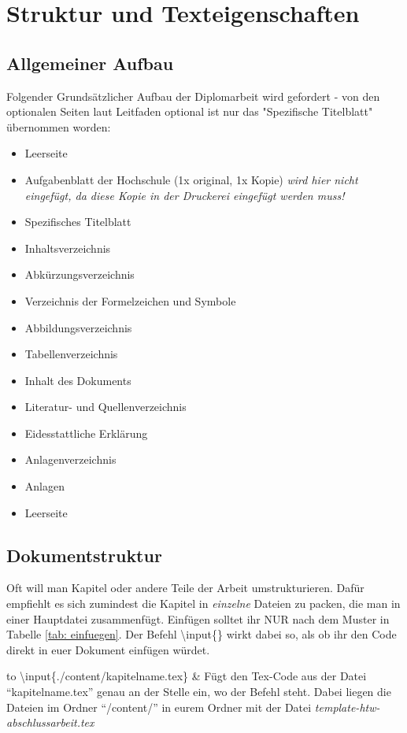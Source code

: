 \chapter{Struktur und Texteigenschaften}%
\section{Allgemeiner Aufbau}%
Folgender Grundsätzlicher Aufbau der Diplomarbeit wird gefordert - von den optionalen Seiten laut Leitfaden optional ist nur das "Spezifische Titelblatt" übernommen worden:%
\begin{itemize}%
 \item Leerseite%
 \item Aufgabenblatt der Hochschule (1x original, 1x Kopie) \emph{wird hier nicht eingefügt, da diese Kopie in der Druckerei eingefügt werden muss!}%
 \item Spezifisches Titelblatt%
 \item Inhaltsverzeichnis%
 \item Abkürzungsverzeichnis%
 \item Verzeichnis der Formelzeichen und Symbole%
 \item Abbildungsverzeichnis%
 \item Tabellenverzeichnis%
 \item Inhalt des Dokuments%
 \item Literatur- und Quellenverzeichnis%
 \item Eidesstattliche Erklärung%
 \item Anlagenverzeichnis%
 \item Anlagen%
 \item Leerseite%
\end{itemize}%
%
%
%
\section{Dokumentstruktur}%
Oft will man Kapitel oder andere Teile der Arbeit umstrukturieren. Dafür empfiehlt es sich zumindest die Kapitel in \emph{einzelne} Dateien zu packen, die man in einer Hauptdatei zusammenfügt. Einfügen solltet ihr \textsc{NUR} nach dem Muster in Tabelle \ref{tab: einfuegen}. Der Befehl \textbackslash input\{\} wirkt dabei so, als ob ihr den Code direkt in euer Dokument einfügen würdet.%
\begin{table}[h]%
\label{tab: einfuegen}%
\begin{tabu} to \textwidth {X[c]X[c]}%
\toprule%
\textbackslash input\{./content/kapitelname.tex\} & Fügt den Tex-Code aus der Datei "`kapitelname.tex"' genau an der Stelle ein, wo der Befehl steht. Dabei liegen die Dateien im Ordner "`/content/"' in eurem Ordner mit der Datei \emph{template-htw-abschlussarbeit.tex}\\%
\bottomrule%
\end{tabu}%
\caption{Einfuegen}%
\end{table}%
%
%
